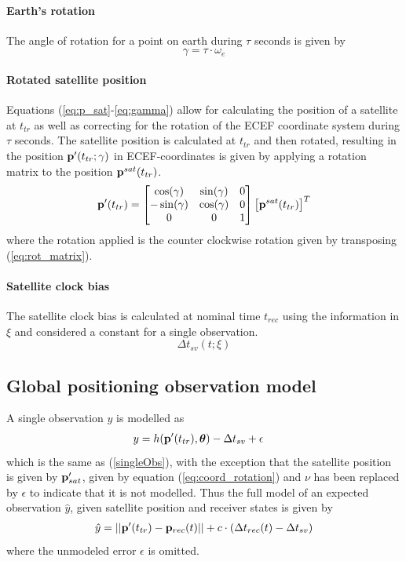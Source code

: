 \paragraph{Earth's rotation}
The angle of rotation for a point on earth during $\tau$ seconds is given by 
\begin{equation}\label{eq:gamma}
\gamma=\tau\cdot\omega_e
\end{equation} 
\paragraph{Rotated satellite position}
Equations (\ref{eq:p_sat}-\ref{eq:gamma}) allow for calculating the position of a satellite at $t_{tr}$ as well as correcting for the rotation of the ECEF coordinate system during $\tau$ seconds. The satellite position is calculated at $t_{tr}$ and then rotated, resulting in the position ${\bf p}'(t_{tr};\gamma)$ in ECEF-coordinates is given by applying a rotation matrix to the position ${\bf p}^{sat}(t_{tr})$.
\begin{equation}\label{eq:coord_rotation}
{\bf p}'(t_{tr})=\begin{bmatrix} \cos(\gamma) &\sin(\gamma) &0\\  -\sin(\gamma) &\cos(\gamma)& 0\\ 0& 0 &1
\end{bmatrix}\left[{\bf p}^{sat}(t_{tr})\right]^T
\end{equation}
where the rotation applied is the counter clockwise rotation given by transposing (\ref{eq:rot_matrix}).
\paragraph{Satellite clock bias}
The satellite clock bias is calculated at nominal time $t_{rec}$ using the information in $\xi$ and considered a constant for a single observation.
\begin{equation} \label{estDtSV}
\Delta t_{sv}(t;\xi)
\end{equation}

\subsection{Global positioning observation model}
A single observation $y$ is modelled as 
\begin{align}
y&=h({\bf p}'(t_{tr}), {\boldsymbol \theta})-\Delta t_{sv}+\epsilon
\end{align}
which is the same as (\ref{singleObs}), with the exception that the satellite position is given by ${\bf p}'_{sat}$, given by equation (\ref{eq:coord_rotation}) and $\nu$ has been replaced by $\epsilon$ to indicate that it is not modelled. Thus the full model of an expected observation $\hat{y}$, given satellite position and receiver states is given by
\begin{align}\label{eq:obsModel}
\hat{y}=||{\bf p}'(t_{tr})-{\bf p}_{rec}(t)||+c\cdot(\Delta t_{rec}(t)-\Delta t_{sv})
\end{align}
where the unmodeled error $\epsilon$ is omitted.

